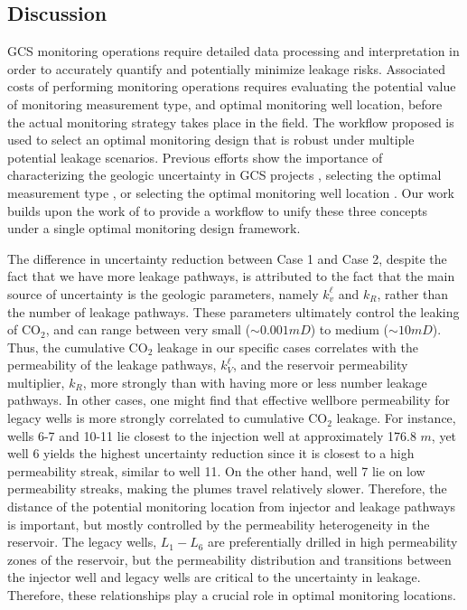 \documentclass[a4paper,fleqn]{cas-sc}
\begin{document}
\subsection{Discussion}
GCS monitoring operations require detailed data processing and interpretation in order to accurately quantify and potentially minimize leakage risks. Associated costs of performing monitoring operations requires evaluating the potential value of monitoring measurement type, and optimal monitoring well location, before the actual monitoring strategy takes place in the field. The workflow proposed is used to select an optimal monitoring design that is robust under multiple potential leakage scenarios. Previous efforts show the importance of characterizing the geologic uncertainty in GCS projects \citep{Jia2018104, Chen2020, Pawar2022}, selecting the optimal measurement type \citep{Yonkofski2016, Oladyshkin2013671}, or selecting the optimal monitoring well location \citep{Sun2013, Sun2019}. Our work builds upon the work of \citet{Chen2018} to provide a workflow to unify these three concepts under a single optimal monitoring design framework.

The difference in uncertainty reduction between Case 1 and Case 2, despite the fact that we have more leakage pathways, is attributed to the fact that the main source of uncertainty is the geologic parameters, namely $k_v^\ell$ and $k_R$, rather than the number of leakage pathways. These parameters ultimately control the leaking of CO$_2$, and can range between very small ($\sim 0.001 mD$) to medium ($\sim 10 mD$). Thus, the cumulative CO$_2$ leakage in our specific cases correlates with the permeability of the leakage pathways, $k_V^\ell$, and the reservoir permeability multiplier, $k_R$, more strongly than with having more or less number leakage pathways. In other cases, one might find that effective wellbore permeability for legacy wells is more strongly correlated to cumulative CO$_2$ leakage. For instance, wells 6-7 and 10-11 lie closest to the injection well at approximately 176.8 $m$, yet well 6 yields the highest uncertainty reduction since it is closest to a high permeability streak, similar to well 11. On the other hand, well 7 lie on low permeability streaks, making the plumes travel relatively slower. Therefore, the distance of the potential monitoring location from injector and leakage pathways is important, but mostly controlled by the permeability heterogeneity in the reservoir. The legacy wells, $L_1-L_6$ are preferentially drilled in high permeability zones of the reservoir, but the permeability distribution and transitions between the injector well and legacy wells are critical to the uncertainty in leakage. Therefore, these relationships play a crucial role in optimal monitoring locations.
\end{document}
